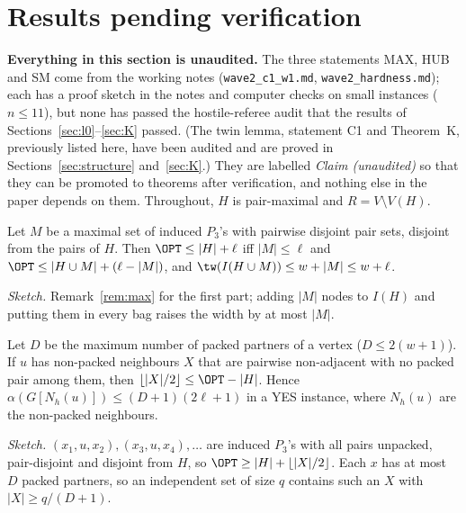 \section{Results pending verification}\label{sec:pending}
\textbf{Everything in this section is unaudited.} The three statements MAX, HUB and SM come from the working notes (\texttt{wave2\_c1\_w1.md}, \texttt{wave2\_hardness.md}); each has a proof sketch in the notes and computer checks on small instances ($n\le11$), but none has passed the hostile-referee audit that the results of Sections~\ref{sec:l0}--\ref{sec:K} passed. (The twin lemma, statement C1 and Theorem~K, previously listed here, have been audited and are proved in Sections~\ref{sec:structure} and~\ref{sec:K}.) They are labelled \emph{Claim (unaudited)} so that they can be promoted to theorems after verification, and nothing else in the paper depends on them. Throughout, $H$ is pair-maximal and $R=V\setminus V(H)$.

\begin{claim}\label{cl:max}
Let $M$ be a maximal set of induced $P_3$'s with pairwise disjoint pair sets, disjoint from the pairs of $H$. Then $\OPT\le|H|+\ell$ iff $|M|\le\ell$ and $\OPT\le|H\cup M|+(\ell-|M|)$, and $\tw(I(H\cup M))\le w+|M|\le w+\ell$.
\end{claim}
\emph{Sketch.} Remark~\ref{rem:max} for the first part; adding $|M|$ nodes to $I(H)$ and putting them in every bag raises the width by at most $|M|$.

\begin{claim}[HUB]\label{cl:hub}
Let $D$ be the maximum number of packed partners of a vertex ($D\le2(w+1)$). If $u$ has non-packed neighbours $X$ that are pairwise non-adjacent with no packed pair among them, then $\lfloor|X|/2\rfloor\le\OPT-|H|$. Hence $\alpha(G[N_h(u)])\le(D+1)(2\ell+1)$ in a YES instance, where $N_h(u)$ are the non-packed neighbours.
\end{claim}
\emph{Sketch.} $(x_1,u,x_2),(x_3,u,x_4),\dots$ are induced $P_3$'s with all pairs unpacked, pair-disjoint and disjoint from $H$, so $\OPT\ge|H|+\lfloor|X|/2\rfloor$. Each $x$ has at most $D$ packed partners, so an independent set of size $q$ contains such an $X$ with $|X|\ge q/(D+1)$.

